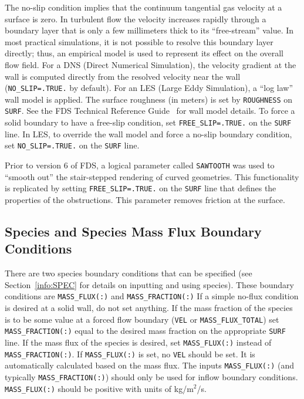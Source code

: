 \documentclass[11pt]{book}
\newcommand{\ct}{\tt\small}
\begin{document}
The no-slip condition implies that the continuum tangential gas velocity at a surface is zero.
In turbulent flow the velocity increases rapidly through a boundary layer that is only a few millimeters thick to its ``free-stream'' value.
In most practical simulations, it is not possible to resolve this boundary layer directly; thus, an empirical model is used to represent its effect on the overall flow field. For a DNS (Direct Numerical Simulation), the velocity gradient at the wall is computed directly from the resolved velocity near the wall ({\ct NO\_SLIP=.TRUE.} by default). For an LES (Large Eddy Simulation), a ``log law'' wall model is applied. The surface roughness (in meters) is set by {\ct ROUGHNESS} on {\ct SURF}. See the FDS Technical Reference Guide~\cite{FDS_Math_Guide} for wall model details. To force a solid boundary to have a free-slip condition, set {\ct FREE\_SLIP=.TRUE.} on the {\ct SURF} line. In LES, to override the wall model and force a no-slip boundary condition, set {\ct NO\_SLIP=.TRUE.} on the {\ct SURF} line.

\begin{warning}
Prior to version 6 of FDS, a logical parameter called {\ct SAWTOOTH} was used to ``smooth out'' the stair-stepped rendering of curved geometries. This functionality is replicated by setting {\ct FREE\_SLIP=.TRUE.} on the {\ct SURF} line that defines the properties of the obstructions. This parameter removes friction at the surface.
\end{warning}


\subsection{Species and Species Mass Flux Boundary Conditions}

\label{info:MASS_FLUX}

There are two species boundary conditions that can be specified
(see Section~\ref{info:SPEC} for details on inputting and using species).
These boundary conditions are {\ct MASS\_FLUX(:)} and {\ct MASS\_FRACTION(:)}
If a simple no-flux condition is desired at a solid wall, do not set
anything. If the mass fraction of the species is to be some
value at a forced flow boundary ({\ct VEL} or {\ct MASS\_FLUX\_TOTAL}) set
{\ct MASS\_FRACTION(:)} equal to the desired mass fraction on the appropriate
{\ct SURF} line.
If the mass flux of the species is desired, set
{\ct MASS\_FLUX(:)} instead of {\ct MASS\_FRACTION(:)}.
If {\ct MASS\_FLUX(:)}
is set, no {\ct VEL} should be set. It is automatically
calculated based on the mass flux.
The inputs {\ct MASS\_FLUX(:)} (and typically {\ct MASS\_FRACTION(:)}) should only be used
for inflow boundary conditions.  {\ct MASS\_FLUX(:)} should be positive with
units of kg/m$^2$/s.
\end{document}
